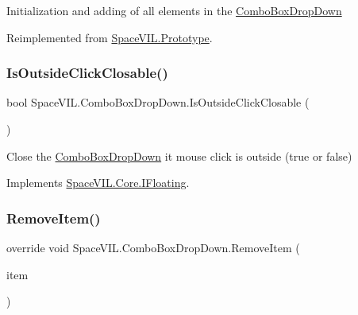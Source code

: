 Initialization and adding of all elements in the \mbox{\hyperlink{class_space_v_i_l_1_1_combo_box_drop_down}{Combo\+Box\+Drop\+Down}} 



Reimplemented from \mbox{\hyperlink{class_space_v_i_l_1_1_prototype_ac3379fe02923ee155b5b0084abf27420}{Space\+V\+I\+L.\+Prototype}}.

\mbox{\label{class_space_v_i_l_1_1_combo_box_drop_down_a9c7ae751788129978bd5977e1295ba47}} 
\subsubsection{\texorpdfstring{Is\+Outside\+Click\+Closable()}{IsOutsideClickClosable()}}
{\footnotesize\ttfamily bool Space\+V\+I\+L.\+Combo\+Box\+Drop\+Down.\+Is\+Outside\+Click\+Closable (\begin{DoxyParamCaption}{ }\end{DoxyParamCaption})}



Close the \mbox{\hyperlink{class_space_v_i_l_1_1_combo_box_drop_down}{Combo\+Box\+Drop\+Down}} it mouse click is outside (true or false) 



Implements \mbox{\hyperlink{interface_space_v_i_l_1_1_core_1_1_i_floating}{Space\+V\+I\+L.\+Core.\+I\+Floating}}.

\mbox{\label{class_space_v_i_l_1_1_combo_box_drop_down_a78a089740c66f8d4cf151da273eafd73}} 
\subsubsection{\texorpdfstring{Remove\+Item()}{RemoveItem()}}
{\footnotesize\ttfamily override void Space\+V\+I\+L.\+Combo\+Box\+Drop\+Down.\+Remove\+Item (\begin{DoxyParamCaption}\item[{\mbox{\hyperlink{interface_space_v_i_l_1_1_core_1_1_i_base_item}{I\+Base\+Item}}}]{item }\end{DoxyParamCaption})\hspace{0.3cm}{\ttfamily [virtual]}}



